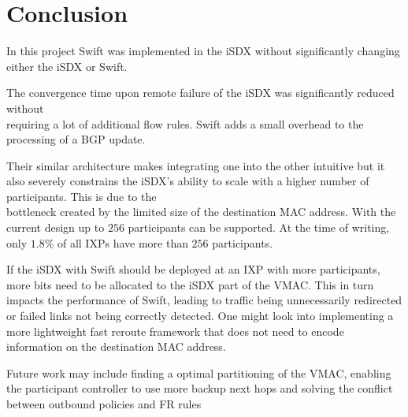 \chapter{\label{chapter7}Conclusion}
In this project Swift was implemented in the iSDX without significantly changing either the iSDX or Swift.

The convergence time upon remote failure of the iSDX was significantly reduced without \\requiring a lot of additional flow rules. Swift adds a small overhead to the processing of a BGP update. 

Their similar architecture makes integrating one into the other intuitive but it also severely constrains the iSDX's ability to scale with a higher number of participants. This is due to the\\bottleneck created by the limited size of the destination MAC address. With the current design up to $256$ participants can be supported. At the time of writing, only $1.8\%$ of all IXPs have more than $256$ participants. \cite{ixps} 


If the iSDX with Swift should be deployed at an IXP with more participants, more bits need to be allocated to the iSDX part of the VMAC. This in turn impacts the performance of Swift, leading to traffic being unnecessarily redirected or failed links not being correctly detected. One might look into implementing a more lightweight fast reroute framework that does not need to encode information on the destination MAC address. 

Future work may include finding a optimal partitioning of the VMAC, enabling the participant controller to use more backup next hops and solving the conflict between outbound policies and FR rules